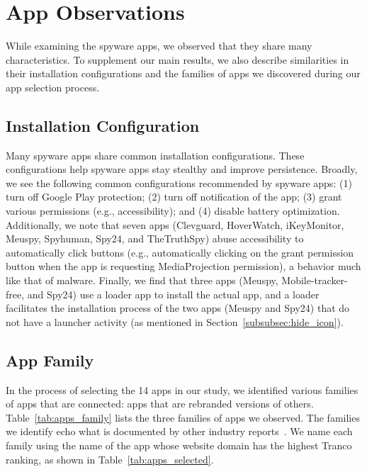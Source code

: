 \hspace*{0.1in}\newpage
\appendix


\section{App Observations}
\label{subsec:additional_observation}

While examining the spyware apps, we observed that they
share many characteristics.  To supplement our main results, we also
describe similarities in their installation configurations and the
families of apps we discovered during our app selection process.

\subsection{Installation Configuration}
\label{subsubsec:install_configure}

Many spyware apps share common installation configurations.  These
configurations help spyware apps stay stealthy and improve
persistence. Broadly, we see the following common configurations
recommended by spyware apps: (1) turn off Google Play protection; (2)
turn off notification of the app; (3) grant various permissions (e.g.,
accessibility); and (4) disable battery optimization.  Additionally,
we note that seven apps (Clevguard, HoverWatch, iKeyMonitor, Meuspy, Spyhuman, Spy24, and TheTruthSpy) abuse accessibility to
automatically click buttons (e.g., automatically clicking on the grant permission button when the app is requesting MediaProjection permission), a
behavior much like that of malware. Finally, we find that three apps
(Meuspy, Mobile-tracker-free, and Spy24) use a loader app to install
the actual app, and a loader facilitates the installation process of the two apps (Meuspy and Spy24) that do not have a launcher activity (as mentioned in Section~\ref{subsubsec:hide_icon}).

\subsection{App Family}
\label{subsubsec:app_family}

In the process of selecting the 14 apps in our study, we identified
various families of apps that are connected: apps
that are rebranded versions of others.  Table~\ref{tab:apps_family} lists the
three families of apps we observed. The families we identify echo what is documented by
other industry reports~\cite{Tekstalk86:online,
esetandr4:online}. We name each family using the name
of the app whose website domain has the highest Tranco ranking, as shown in
Table~\ref{tab:apps_selected}.

